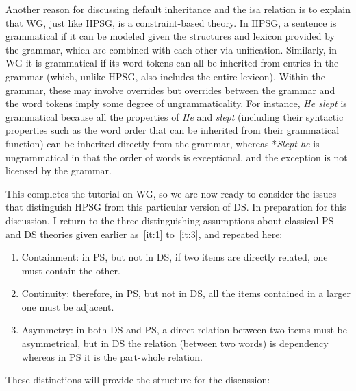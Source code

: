 \documentclass[output=paper]{langscibook}
\begin{document}
Another reason for discussing default inheritance and the isa relation is to explain that WG, just like HPSG, is a constraint-based theory. In HPSG, a sentence is grammatical if it can be modeled given the structures and lexicon provided by the grammar, which are combined with each other via unification. Similarly, in WG it is grammatical if its word tokens can all be inherited from entries in the grammar (which, unlike HPSG, also includes the entire lexicon). Within the grammar, these may involve overrides but overrides between the grammar and the word tokens imply some degree of ungrammaticality. For instance, \emph{He slept} is grammatical because all the properties of \emph{He} and \emph{slept} (including their syntactic properties such as the word order that can be inherited from their grammatical function) can be inherited directly from the grammar, whereas *\emph{Slept he} is ungrammatical in that the order of words is exceptional, and the exception is not licensed by the grammar.

This completes the tutorial on WG, so we are now ready to consider the issues that distinguish HPSG from this particular version of DS. In preparation for this discussion, I return to the three distinguishing assumptions about classical PS and DS theories given earlier as~\ref{it:1} to~\ref{it:3}, and repeated here:

\begin{enumerate}
	\item Containment: in PS, but not in DS, if two items are directly related, one must contain the other.
	
	\item Continuity: therefore, in PS, but not in DS, all the items contained in a larger one must be adjacent.
	
	\item Asymmetry: in both DS and PS, a direct relation between two items must be asymmetrical, but in DS the relation (between two words) is dependency whereas in PS it is the part-whole relation.
\end{enumerate}

These distinctions will provide the structure for the discussion:
\end{document}
